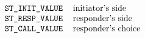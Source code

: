 
\normalsize
\[\begin{tabular}{rl}
\tt ST\_INIT\_VALUE&	initiator's side\\
\tt ST\_RESP\_VALUE&	responder's side\\
\tt ST\_CALL\_VALUE&	responder's choice
\end{tabular}\]
